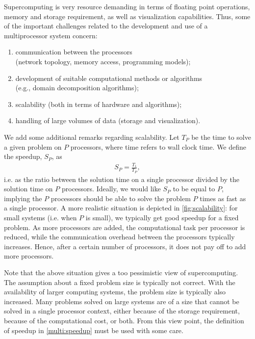 Supercomputing is very resource demanding in terms of floating point operations,
memory and storage requirement, as well as visualization capabilities. Thus,
some of the important challenges related to the development and use of a
multiprocessor system concern:
\begin{enumerate}
\item communication between the processors \\
(network topology, memory access, programming models);
\item development of suitable computational methods or algorithms \\
(e.g., domain decomposition algorithms);
\item scalability (both in terms of hardware and algorithms);
\item handling of large volumes of data (storage and visualization).
\end{enumerate}

We add some additional remarks regarding scalability. Let $T_P$ be the time to
solve a given problem on $P$ processors, where time refers to wall clock time.
We define the speedup, $S_P$, as
\begin{align}
  S_P = \frac{T_1}{T_P},
  \label{multi:speedup}
\end{align}
i.e. as the ratio between the solution time on a single processor divided by the
solution time on $P$ processors. Ideally, we would like $S_P$ to be equal to
$P$, implying the $P$ processors should be able to solve the problem $P$ times
as fast as a single processor. A more realistic situation is depicted in
\autoref{fig:scalability}: for small systems (i.e. when $P$ is small), we
typically get good speedup for a fixed problem. As more processors are added,
the computational task per processor is reduced, while the communication
overhead between the processors typically increases. Hence, after a certain
number of processors, it does not pay off to add more processors.

Note that the above situation gives a too pessimistic view of supercomputing.
The assumption about a fixed problem size is typically not correct. With the
availability of larger computing systems, the problem size is typically also
increased. Many problems solved on large systems are of a size that cannot be
solved in a single processor context, either because of the storage requirement,
because of the computational cost, or both. From this view point, the definition
of speedup in \eqref{multi:speedup} must be used with some care.

